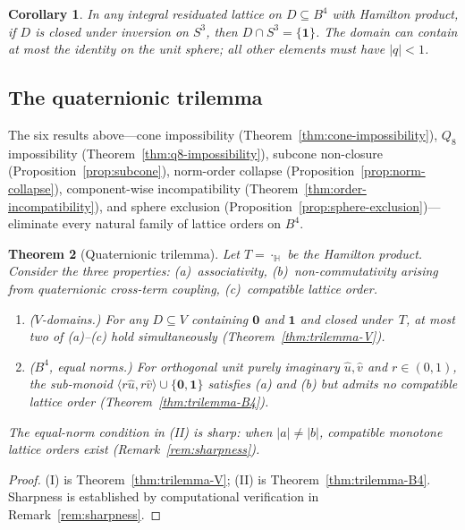 \documentclass[11pt,a4paper]{article}
\newtheorem{theorem}{Theorem}
\newtheorem{corollary}[theorem]{Corollary}
\newcommand{\Hq}{\mathbb{H}}
\begin{document}
\begin{corollary}
\label{cor:sphere-exclusion}
In any integral residuated lattice on $D \subseteq B^4$ with Hamilton
product, if $D$ is closed under inversion on $S^3$, then
$D \cap S^3 = \{\mathbf{1}\}$. The domain can contain at most the
identity on the unit sphere; all other elements must have
$|q| < 1$.
\end{corollary}

\subsection{The quaternionic trilemma}

The six results above---cone impossibility
(Theorem~\ref{thm:cone-impossibility}), $Q_8$ impossibility
(Theorem~\ref{thm:q8-impossibility}), subcone non-closure
(Proposition~\ref{prop:subcone}), norm-order collapse
(Proposition~\ref{prop:norm-collapse}), component-wise incompatibility
(Theorem~\ref{thm:order-incompatibility}), and sphere exclusion
(Proposition~\ref{prop:sphere-exclusion})---eliminate every natural
family of lattice orders on $B^4$.

\begin{theorem}[Quaternionic trilemma]
\label{thm:trilemma}
Let $T = \cdot_{\Hq}$ be the Hamilton product. Consider the three
properties: \textup{(a)}~associativity, \textup{(b)}~non-commutativity
arising from quaternionic cross-term coupling,
\textup{(c)}~compatible lattice order.
\begin{enumerate}[label=(\Roman*),nosep]
\item \textup{($V$-domains.)} For any $D \subseteq V$ containing
  $\mathbf{0}$ and $\mathbf{1}$ and closed under~$T$, at most two
  of \textup{(a)--(c)} hold simultaneously
  \textup{(}Theorem~\ref{thm:trilemma-V}\textup{)}.
\item \textup{($B^4$, equal norms.)} For orthogonal unit purely
  imaginary $\hat{u}, \hat{v}$ and $r \in (0,1)$, the sub-monoid
  $\langle r\hat{u}, r\hat{v}\rangle \cup \{\mathbf{0}, \mathbf{1}\}$
  satisfies \textup{(a)} and \textup{(b)} but admits no compatible
  lattice order \textup{(}Theorem~\ref{thm:trilemma-B4}\textup{)}.
\end{enumerate}
The equal-norm condition in \textup{(II)} is sharp: when $|a| \neq |b|$,
compatible monotone lattice orders exist
\textup{(}Remark~\ref{rem:sharpness}\textup{)}.
\end{theorem}

\begin{proof}
(I) is Theorem~\ref{thm:trilemma-V}; (II) is
Theorem~\ref{thm:trilemma-B4}. Sharpness is established by
computational verification in Remark~\ref{rem:sharpness}.
\end{proof}
\end{document}
